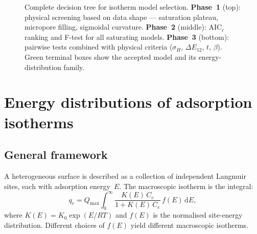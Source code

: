 \documentclass[journal=jacsat,manuscript=article]{achemso}
\begin{document}
\begin{figure}[p]
	\caption{Complete decision tree for isotherm model selection.
		\textbf{Phase~1} (top): physical screening based on data shape
		--- saturation plateau, micropore filling, sigmoidal curvature.
		\textbf{Phase~2} (middle): AIC$_c$ ranking and F-test for all
		saturating models.
		\textbf{Phase~3} (bottom): pairwise tests combined with physical
criteria ($\sigma_H$, $\Delta E_{12}$, $t$, $\beta$).
		Green terminal boxes show the accepted model and its
		energy-distribution family.}
	\label{fig:si_decision_tree}
\end{figure}


\section{Energy distributions of adsorption isotherms}
\label{sec:si_distributions}

\subsection{General framework}
\label{sec:si_energy_framework}

A heterogeneous surface is described as a collection of independent
Langmuir sites, each with adsorption energy~$E$.  The macroscopic
isotherm is the integral:
\begin{equation}
	q_e = Q_{\max} \int_{0}^{\infty}
	\frac{K(E)\, C_e}{1 + K(E)\, C_e}\, f(E)\, \mathrm{d}E,
	\label{eq:si_heterogeneous_integral}
\end{equation}
where $K(E) = K_0\exp(E/RT)$ and $f(E)$ is the normalised site-energy
distribution.  Different choices of $f(E)$ yield different
macroscopic isotherms.
\end{document}

